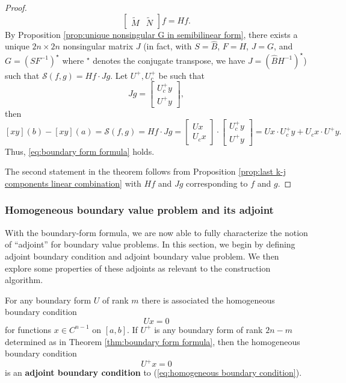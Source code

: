 \documentclass[11pt, oneside, a4paper]{article}
\begin{document}
\begin{proof}
\[\begin{bmatrix}
    \tilde{M} & \tilde{N}\end{bmatrix}f = Hf.\]
    By Proposition \ref{prop:unique nonsingular G in semibilinear form}, there exists a unique $2n\times 2n$ nonsingular matrix $J$ (in fact, with $S = \hat{B}$, $F=H$, $J=G$, and $G=(SF^{-1})^\star$ where $^\star$ denotes the conjugate transpose, we have $J=(\hat{B}H^{-1})^\star$) such that $\mathcal{S}(f,g) = Hf\cdot Jg$. Let $U^+, U_c^+$ be such that
    \[Jg = \begin{bmatrix}U_c^+ y\\ U^+y\end{bmatrix},\]
    then 
    \[[xy](b)-[xy](a)=\mathcal{S}(f,g) = Hf\cdot Jg = \begin{bmatrix}Ux\\ U_cx\end{bmatrix}\cdot\begin{bmatrix}U_c^+ y \\ U^+y\end{bmatrix} = Ux\cdot U_c^+y + U_cx\cdot U^+y.\]
    Thus, \eqref{eq:boundary form formula} holds.

    The second statement in the theorem follows from Proposition \ref{prop:last k-j components linear combination} with $Hf$ and $Jg$ corresponding to $f$ and $g$.
\end{proof}

\subsubsection{Homogeneous boundary value problem and its adjoint}
With the boundary-form formula, we are now able to fully characterize the notion of ``adjoint'' for boundary value problems. In this section, we begin by defining adjoint boundary condition and adjoint boundary value problem. We then explore some properties of these adjoints as relevant to the construction algorithm.

\begin{defn}\cite[p.288-89]{CoddingtonLevinson}\label{defn:adjoint boundary condition}
    For any boundary form $U$ of rank $m$ there is associated the homogeneous boundary condition
    \begin{equation}\label{eq:homogeneous boundary condition}
        Ux=0
    \end{equation}
    for functions $x\in C^{n-1}$ on $[a,b]$. If $U^+$ is any boundary form of rank $2n-m$ determined as in Theorem \ref{thm:boundary form formula}, then the homogeneous boundary condition
    \begin{equation}\label{eq:adjoint boundary condition}
        U^+x=0
    \end{equation}
    is an \textbf{adjoint boundary condition} to (\ref{eq:homogeneous boundary condition}).
\end{defn}
\end{document}
